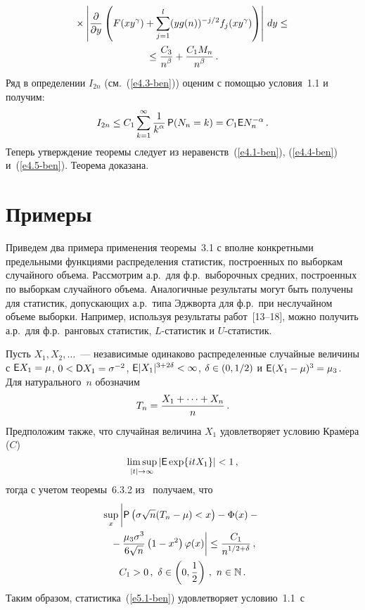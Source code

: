\begin{multicols}{2}
\noindent
\begin{multline}
{}\times  \left|\displaystyle\frac{\displaystyle \partial\mathstrut}{\displaystyle \partial y\mathstrut} \left(F(xy^\gamma) +
\sum\limits_{j=1}^l (yg(n))^{-j/2} f_j(xy^\gamma)\right)\right|\, dy \le{}\\
{}\le
\displaystyle\frac{\displaystyle C_3\mathstrut}{\displaystyle n^\beta\mathstrut} + \displaystyle\frac{\displaystyle C_1M_n\mathstrut}{\displaystyle n^\beta\mathstrut}\,.  \label{e4.4-ben}
\end{multline}
Ряд  в определении $I_{2n}$   (см.~(\ref{e4.3-ben})) оценим с помощью условия~1.1 и получим:
\begin{equation}
I_{2n}  \leq C_1  \sum\limits_{k=1}^{\infty} \displaystyle\frac{\displaystyle 1\mathstrut}{\displaystyle k^\alpha\mathstrut}\, {{\sf P}}(N_n=k)
= C_1 {\sf E} N_n^{-\alpha}\,.    \label{e4.5-ben}
\end{equation}
Теперь утверждение теоремы следует из неравенств~(\ref{e4.1-ben}), (\ref{e4.4-ben}) и~(\ref{e4.5-ben}).
Теорема доказана.


\section{Примеры}

Приведем два примера применения теоремы~3.1 с вполне конкретными
предельными функциями распределения статистик, построенных по
выборкам случайного объема. Рассмотрим а.р.\
для ф.р.\ выборочных средних, построенных по выборкам случайного
объема. Аналогичные результаты могут быть получены для статистик,
допускающих а.р.\ типа Эдж\-вор\-та для ф.р.\ при
неслучайном объеме выборки. Например, используя результаты работ~[13--18], 
можно получить а.р.\ для  ф.р.\
ранговых статистик, $L$-ста\-ти\-стик и $U$-ста\-ти\-стик.

Пусть $X_1,X_2,\ldots$~--- независимые одинаково распределенные
случайные величины с ${\sf E}X_1 \hm= \mu$, $0\hm<{\sf D}X_1
\hm=\sigma^{-2}$, $\e |X_1|^{3+2\delta} \hm< \infty$,
$\delta\hm\in(0,1/2)$ и ${\sf E}(X_1 - \mu)^3 \hm= \mu_3$. Для
натурального~$n$ обозначим
\begin{equation}
T_n = \displaystyle\frac{\displaystyle X_1 + \cdots + X_n\mathstrut}{\displaystyle n\mathstrut}\,.\label{e5.1-ben}
\end{equation}
Предположим также, что случайная величина $X_1$ удовлетворяет
условию Крам$\acute{\mbox{е}}$ра ($C$)
$$
\limsup\limits_{|t|\to\infty} |{\sf E} \exp\{itX_1\}| < 1\,,
$$
тогда с учетом  теоремы~6.3.2 из~\cite{22-ben} получаем, что
\begin{multline}
\sup\limits_x \left|\vphantom{\fr{\mu_3 \sigma^3}{6 \sqrt n}}
{\p}\left(\sigma \sqrt n(T_n - \mu) < x\right) - \Phi(x)
- {}\right.\\
\left.{}-\fr{\mu_3 \sigma^3}{6 \sqrt n} \left(1 - x^2\right) \varphi(x) \right| \leq
\fr{C_1}{n^{1/2+\delta}}\,,  \\  C_1 > 0\,, \  \delta \in
\left(0,\fr{1}{2}\right)\,,
\   n \in \N\,. \label{e5.2-ben}
\end{multline}
Таким образом, статистика~(\ref{e5.1-ben}) удовлетворяет условию~1.1~с


\end{multicols}
